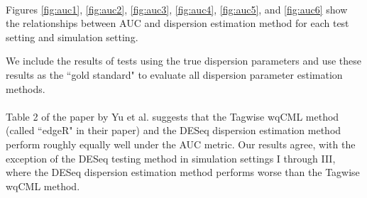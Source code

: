 \documentclass[10pt]{article}
\begin{document}
{\color{blue} \paragraph{} \indent Figures \ref{fig:auc1}, \ref{fig:auc2}, \ref{fig:auc3}, \ref{fig:auc4}, \ref{fig:auc5}, and \ref{fig:auc6} 
show the relationships between AUC and dispersion estimation method for each test setting and simulation setting.} We include the results of tests using the true dispersion parameters and use these results as the ``gold standard" to evaluate all dispersion parameter estimation methods. %

{\color{blue}
\paragraph{} \indent Table 2 of the paper by Yu et al. \cite{yu} suggests that the Tagwise wqCML method (called ``edgeR" in their paper) and the DESeq dispersion estimation method perform roughly equally well under the AUC metric. Our results agree, with the exception of the DESeq testing method in simulation settings I through III, where the DESeq dispersion estimation method performs worse than the Tagwise wqCML method. }
\end{document}
